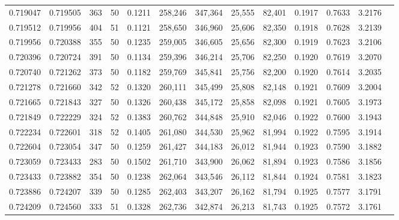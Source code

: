 \begin{tabular}{rrrrrrrrrrrrr}
0.719047 & 0.719505 &   363 &  50 &                                     0.1211 & 258,246 & 347,364 &  25,555 &  82,401 & 0.1917 & 0.7633 & 3.2176 \\
0.719512 & 0.719956 &   404 &  51 &                                     0.1121 & 258,650 & 346,960 &  25,606 &  82,350 & 0.1918 & 0.7628 & 3.2139 \\
0.719956 & 0.720388 &   355 &  50 &                                     0.1235 & 259,005 & 346,605 &  25,656 &  82,300 & 0.1919 & 0.7623 & 3.2106 \\
0.720396 & 0.720724 &   391 &  50 &                                     0.1134 & 259,396 & 346,214 &  25,706 &  82,250 & 0.1920 & 0.7619 & 3.2070 \\
0.720740 & 0.721262 &   373 &  50 &                                     0.1182 & 259,769 & 345,841 &  25,756 &  82,200 & 0.1920 & 0.7614 & 3.2035 \\
0.721278 & 0.721660 &   342 &  52 &                                     0.1320 & 260,111 & 345,499 &  25,808 &  82,148 & 0.1921 & 0.7609 & 3.2004 \\
0.721665 & 0.721843 &   327 &  50 &                                     0.1326 & 260,438 & 345,172 &  25,858 &  82,098 & 0.1921 & 0.7605 & 3.1973 \\
0.721849 & 0.722229 &   324 &  52 &                                     0.1383 & 260,762 & 344,848 &  25,910 &  82,046 & 0.1922 & 0.7600 & 3.1943 \\
0.722234 & 0.722601 &   318 &  52 &                                     0.1405 & 261,080 & 344,530 &  25,962 &  81,994 & 0.1922 & 0.7595 & 3.1914 \\
0.722604 & 0.723054 &   347 &  50 &                                     0.1259 & 261,427 & 344,183 &  26,012 &  81,944 & 0.1923 & 0.7590 & 3.1882 \\
0.723059 & 0.723433 &   283 &  50 &                                     0.1502 & 261,710 & 343,900 &  26,062 &  81,894 & 0.1923 & 0.7586 & 3.1856 \\
0.723433 & 0.723882 &   354 &  50 &                                     0.1238 & 262,064 & 343,546 &  26,112 &  81,844 & 0.1924 & 0.7581 & 3.1823 \\
0.723886 & 0.724207 &   339 &  50 &                                     0.1285 & 262,403 & 343,207 &  26,162 &  81,794 & 0.1925 & 0.7577 & 3.1791 \\
0.724209 & 0.724560 &   333 &  51 &                                     0.1328 & 262,736 & 342,874 &  26,213 &  81,743 & 0.1925 & 0.7572 & 3.1761 \\

\end{tabular}
